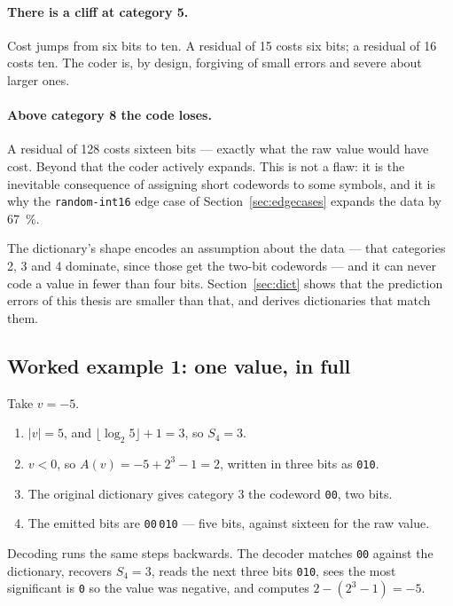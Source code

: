 \paragraph{There is a cliff at category 5.}
Cost jumps from six bits to ten. A residual of \num{15} costs six bits; a
residual of \num{16} costs ten. The coder is, by design, forgiving of small
errors and severe about larger ones.

\paragraph{Above category 8 the code loses.}
A residual of \num{128} costs sixteen bits --- exactly what the raw value
would have cost. Beyond that the coder actively expands. This is not a flaw:
it is the inevitable consequence of assigning short codewords to some symbols,
and it is why the \texttt{random-int16} edge case of
Section~\ref{sec:edgecases} expands the data by \SI{67}{\percent}.

The dictionary's shape encodes an assumption about the data --- that categories
2, 3 and 4 dominate, since those get the two-bit codewords --- and it can never
code a value in fewer than four bits. Section~\ref{sec:dict} shows that the
prediction errors of this thesis are smaller than that, and derives
dictionaries that match them.

\subsection{Worked example 1: one value, in full}

Take $v = -5$.

\begin{enumerate}
\item $|v| = 5$, and $\lfloor \log_2 5 \rfloor + 1 = 3$, so $S_4 = 3$.
\item $v < 0$, so $A(v) = -5 + 2^3 - 1 = 2$, written in three bits as
\texttt{010}.
\item The original dictionary gives category 3 the codeword \texttt{00}, two
bits.
\item The emitted bits are \texttt{00}\,\texttt{010} --- five bits, against
sixteen for the raw value.
\end{enumerate}

Decoding runs the same steps backwards. The decoder matches \texttt{00} against
the dictionary, recovers $S_4 = 3$, reads the next three bits \texttt{010},
sees the most significant is \texttt{0} so the value was negative, and computes
$2 - (2^3 - 1) = -5$.

